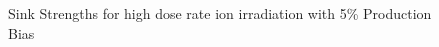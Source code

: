 \documentclass[a4paper]{article}
\begin{document}
      \begin{figure}[h!]  %
        \centering
        \qquad
        \caption{Sink Strengths for high dose rate ion irradiation with 5\% Production Bias}
        \label{figure:sink_strengths_ion_5_1e-6}
      \end{figure}
\end{document}
